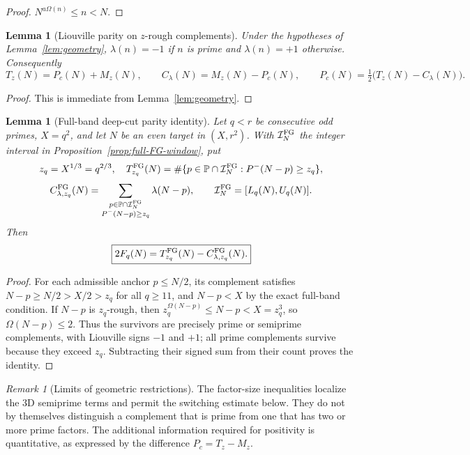 \documentclass[final,11pt]{elsarticle}
\newtheorem{lemma}[theorem]{Lemma}
\theoremstyle{definition}
\theoremstyle{remark}
\newtheorem{remark}[theorem]{Remark}
\newcommand{\PP}{\mathbb{P}}
\newcommand{\Pm}{P^{-}}
\numberwithin{equation}{section}
\begin{document}
\begin{proof}
$N^{a\Omega(n)}\le n<N$. \qedhere
\end{proof}

\begin{lemma}[Liouville parity on $z$-rough complements]\label{lem:parity}
Under the hypotheses of Lemma~\ref{lem:geometry}, $\lambda(n)=-1$ if $n$ is prime and $\lambda(n)=+1$ otherwise. Consequently
\[
T_z(N)=P_c(N)+M_z(N),\qquad C_\lambda(N)=M_z(N)-P_c(N),\qquad P_c(N)=\tfrac12\bigl(T_z(N)-C_\lambda(N)\bigr).
\]
\end{lemma}

\begin{proof}
This is immediate from Lemma~\ref{lem:geometry}.  \qedhere
\end{proof}

\begin{lemma}[Full-band deep-cut parity identity]
\label{lem:full-FG-parity}
Let $q<r$ be consecutive odd primes, $X=q^2$, and let $N$ be an
even target in $(X,r^2)$. With $\mathcal I_N^{\rm FG}$ the integer
interval in Proposition~\ref{prop:full-FG-window}, put
\[
z_q=X^{1/3}=q^{2/3},\quad
T_{z_q}^{\rm FG}(N)
=\#\{p\in\PP\cap\mathcal I_N^{\rm FG}:\Pm(N-p)\ge z_q\},
\]
\[
C_{\lambda,z_q}^{\rm FG}(N)
=\sum_{\substack{p\in\PP\cap\mathcal I_N^{\rm FG}\\\Pm(N-p)\ge z_q}}\lambda(N-p),
\qquad
\mathcal I_N^{\rm FG}=[L_q(N),U_q(N)].
\]
Then
\begin{equation}\label{eq:full-FG-parity}
\boxed{\displaystyle
2F_q(N)=T_{z_q}^{\rm FG}(N)-C_{\lambda,z_q}^{\rm FG}(N).}
\end{equation}
\end{lemma}
\begin{proof}
For each admissible anchor $p\le N/2$, its complement satisfies
$N-p\ge N/2>X/2>z_q$ for all $q\ge11$, and
$N-p<X$ by the exact full-band condition. If $N-p$ is $z_q$-rough,
then $z_q^{\Omega(N-p)}\le N-p<X=z_q^3$, so
$\Omega(N-p)\le2$. Thus the survivors are precisely prime or
semiprime complements, with Liouville signs $-1$ and $+1$;
all prime complements survive because they exceed $z_q$.
Subtracting their signed sum from their count proves the identity.
\end{proof}

\begin{remark}[Limits of geometric restrictions]
The factor-size inequalities localize the 3D semiprime terms and permit the switching estimate below. They do not by themselves distinguish a complement that is prime from one that has two or more prime factors. The additional information required for positivity is quantitative, as expressed by the difference $P_c=T_z-M_z$.
\end{remark}
\end{document}
